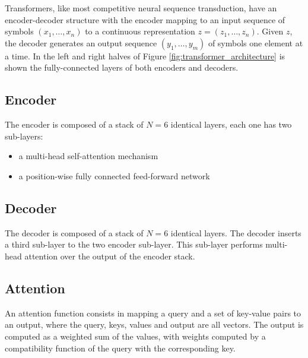 \documentclass[\main/main.tex]{subfiles}
\begin{document}
Transformers, like most competitive neural sequence transduction, have an encoder-decoder structure with the encoder mapping to an input sequence of symbols $(x_1, \dots, x_n)$ to a continuous representation $z = (z_1, \dots, z_n)$. Given $z$, the decoder generates an output sequence $(y_1, \dots, y_m)$ of symbols one element at a time. In the left and right halves of Figure \ref{fig:transformer_architecture} is shown the fully-connected layers of both encoders and decoders.
\subsection{Encoder}
The encoder is composed of a stack of $N=6$ identical layers, each one has two sub-layers:
\begin{itemize}
    \item a multi-head self-attention mechanism
    \item a position-wise fully connected feed-forward network
\end{itemize}
\subsection{Decoder}
The decoder is composed of a stack of $N=6$ identical layers. The decoder inserts a third sub-layer to the two encoder sub-layer. This sub-layer performs multi-head attention over the output of the encoder stack.
\subsection{Attention}
An attention function consists in mapping a query and a set of key-value pairs to an output, where the query, keys, values and output are all vectors. The output is computed as a weighted sum of the values, with weights computed by a compatibility function of the query with the corresponding key.
\end{document}
